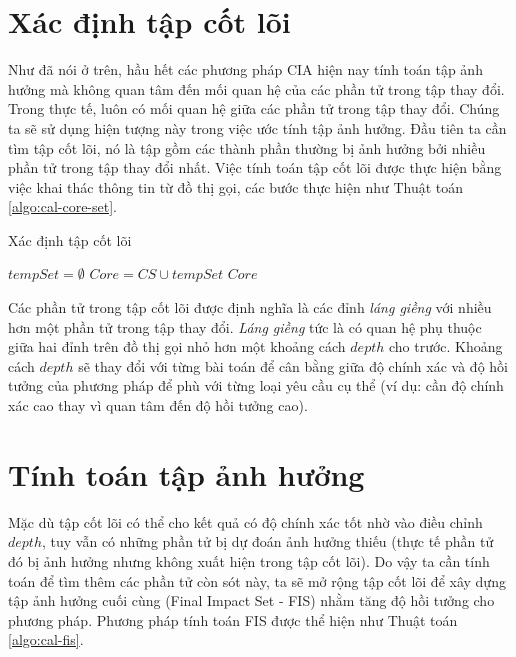 \documentclass[12pt,a4paper]{report}
\newenvironment{thuattoan}[1][h]
  {\renewcommand{\algorithmcfname}{Thuật toán}
   \begin{algorithm}[#1]
  }{\end{algorithm}}
\begin{document}
\section{Xác định tập cốt lõi}
Như đã nói ở trên, hầu hết các phương pháp CIA hiện nay tính toán tập ảnh hưởng mà không quan tâm đến mối quan hệ của các phần tử trong tập thay đổi. Trong thực tế, luôn có mối quan hệ giữa các phần tử trong tập thay đổi. Chúng ta sẽ sử dụng hiện tượng này trong việc ước tính tập ảnh hưởng. Đầu tiên ta cần tìm tập cốt lõi, nó là tập gồm các thành phần thường bị ảnh hưởng bởi nhiều phần tử trong tập thay đổi nhất. Việc tính toán tập cốt lõi được thực hiện bằng việc khai thác thông tin từ đồ thị gọi, các bước thực hiện như Thuật toán \ref{algo:cal-core-set}.\\

\begin{thuattoan}
\label{algo:cal-core-set}
\caption{Xác định tập cốt lõi}

 $tempSet = \emptyset$\;
 $Core = CS \cup tempSet$\;
 \Return $Core$\;
\end{thuattoan}

Các phần tử trong tập cốt lõi được định nghĩa là các đỉnh \textit{láng giềng} với nhiều hơn một phần tử trong tập thay đổi. \textit{Láng giềng} tức là có quan hệ phụ thuộc giữa hai đỉnh trên đồ thị gọi nhỏ hơn một khoảng cách $depth$ cho trước. Khoảng cách $depth$ sẽ thay đổi với từng bài toán để cân bằng giữa độ chính xác và độ hồi tưởng của phương pháp để phù với từng loại yêu cầu cụ thể (ví dụ: cần độ chính xác cao thay vì quan tâm đến độ hồi tưởng cao).\\

\section{Tính toán tập ảnh hưởng}
Mặc dù tập cốt lõi có thể cho kết quả có độ chính xác tốt nhờ vào điều chỉnh $depth$, tuy vẫn có những phần tử bị dự đoán ảnh hưởng thiếu (thực tế phần tử đó bị ảnh hưởng nhưng không xuất hiện trong tập cốt lõi). Do vậy ta cần tính toán để tìm thêm các phần tử còn sót này, ta sẽ mở rộng tập cốt lõi để xây dựng tập ảnh hưởng cuối cùng (Final Impact Set - FIS) nhằm tăng độ hồi tưởng cho phương pháp. Phương pháp tính toán FIS được thể hiện như Thuật toán \ref{algo:cal-fis}. \\
\end{document}
